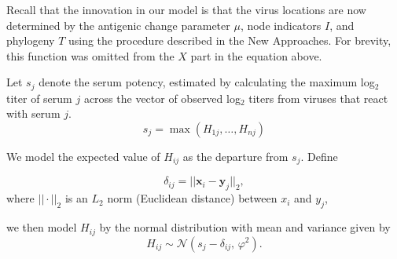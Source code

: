 \documentclass[11pt,oneside,letterpaper]{article}
\newcommand{\virus}{\mathbf{x}}						%
\newcommand{\serum}{\mathbf{y}}						%
\newcommand{\viruses}{\mathbf{X}}					%
\newcommand{\sera}{\mathbf{Y}}						%
\newcommand{\se}{s}									%
\newcommand{\point}{f_{\scriptscriptstyle \vert}}	%
\newcommand{\mdssd}{\varphi}						%
\newcommand{\vn}{n}									%
\newcommand{\normal}{\mathcal{N}}					%
\begin{document}
Recall that the innovation in our model is that the virus locations are now determined by the antigenic change parameter $\mu$, node indicators $I$, and phylogeny $T$ using the procedure described in the New Approaches. 
For brevity, this function was omitted from the $X$ part in the equation above.

Let $s_j$ denote the serum potency, estimated by calculating the maximum log$_2$ titer of serum $j$ across the vector of observed log$_2$ titers from viruses that react with serum $j$.
\begin{equation}
	\se_j = \max ( H_{1j},\ldots,H_{\vn j} )
\end{equation}

We model the expected value of $H_{ij}$ as the departure from $\se_j$. Define

\begin{equation}
	\delta_{ij} =  || \virus_i - \serum_j ||_2,
\end{equation}
where $|| \cdot ||_2$ is an $L_2$ norm (Euclidean distance) between $x_i$ and $y_j$,

we then model $H_{ij}$ by the normal distribution with mean and variance given by 
\begin{equation} \label{hij}
	H_{ij} \sim \normal( \se_j - \delta_{ij}, \, \mdssd^2 ).
\end{equation}


 





\end{document}
